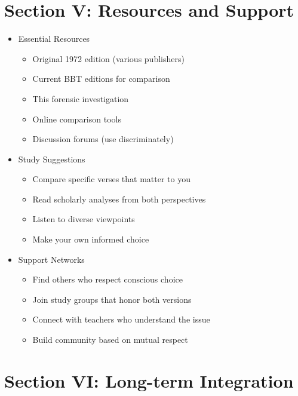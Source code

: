 \documentclass[11pt,twoside]{book}
\begin{document}
\section*{Section V: Resources and Support}
\label{sec:orgd01bf04}

\begin{itemize}
\item Essential Resources
\label{sec:orgf58719b}
\begin{itemize}
\item Original 1972 edition (various publishers)
\item Current BBT editions for comparison
\item This forensic investigation
\item Online comparison tools
\item Discussion forums (use discriminately)
\end{itemize}
\item Study Suggestions
\label{sec:org5f6af55}
\begin{itemize}
\item Compare specific verses that matter to you
\item Read scholarly analyses from both perspectives
\item Listen to diverse viewpoints
\item Make your own informed choice
\end{itemize}
\item Support Networks
\label{sec:org40dde05}
\begin{itemize}
\item Find others who respect conscious choice
\item Join study groups that honor both versions
\item Connect with teachers who understand the issue
\item Build community based on mutual respect
\end{itemize}
\end{itemize}
\section*{Section VI: Long-term Integration}
\label{sec:org99808d4}
\end{document}
